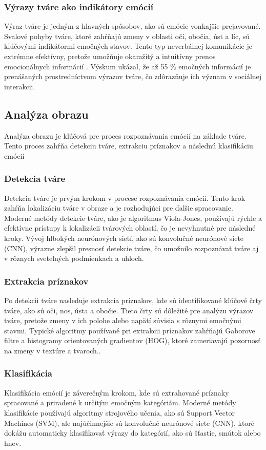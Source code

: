 \subsubsection{Výrazy tváre ako indikátory emócií}
Výraz tváre je jedným z hlavných spôsobov, ako sú emócie vonkajšie prejavované. Svalové pohyby tváre, ktoré zahŕňajú zmeny v oblasti očí, obočia, úst a líc, sú kľúčovými indikátormi emočných stavov. Tento typ neverbálnej komunikácie je extrémne efektívny, pretože umožňuje okamžitý a intuitívny prenos emocionálnych informácií​ \cite{8614755}. Výskum ukázal, že až 55 \% emočných informácií je prenášaných prostredníctvom výrazov tváre, čo zdôrazňuje ich význam v sociálnej interakcii​. \cite{9674818}
\subsection{Analýza obrazu}
Analýza obrazu je kľúčová pre proces rozpoznávania emócií na základe tváre. Tento proces zahŕňa detekciu tváre, extrakciu príznakov a následnú klasifikáciu emócií​
\subsubsection{Detekcia tváre}
Detekcia tváre je prvým krokom v procese rozpoznávania emócií. Tento krok zahŕňa lokalizáciu tváre v obraze a je rozhodujúci pre ďalšie spracovanie. Moderné metódy detekcie tváre, ako je algoritmus Viola-Jones, používajú rýchle a efektívne prístupy k lokalizácii tvárových oblastí, čo je nevyhnutné pre následné kroky​. Vývoj hlbokých neurónových sietí, ako sú konvolučné neurónové siete (CNN), výrazne zlepšil presnosť detekcie tváre, čo umožnilo rozpoznávať tváre aj v rôznych svetelných podmienkach a uhloch​.\cite{9674818}
\subsubsection{Extrakcia príznakov}
Po detekcii tváre nasleduje extrakcia príznakov, kde sú identifikované kľúčové črty tváre, ako sú oči, nos, ústa a obočie. Tieto črty sú dôležité pre analýzu výrazov tváre, pretože zmeny v ich polohe alebo napätí súvisia s rôznymi emočnými stavmi​. \cite{8614755} Typické algoritmy používané pri extrakcii príznakov zahŕňajú Gaborove filtre a histogramy orientovaných gradientov (HOG), ktoré zameriavajú pozornosť na zmeny v textúre a tvaroch​.\cite{9674818}.
\subsubsection{Klasifikácia}
Klasifikácia emócií je záverečným krokom, kde sú extrahované príznaky spracované a priradené k určitým emočným kategóriám. Moderné metódy klasifikácie používajú algoritmy strojového učenia, ako sú Support Vector Machines (SVM), ale najúčinnejšie sú konvolučné neurónové siete (CNN), ktoré dokážu automaticky klasifikovať výrazy do kategórií, ako sú šťastie, smútok alebo hnev​. \cite{8614755} \cite{9674818}

